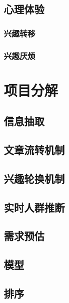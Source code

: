 \documentclass[11pt]{article}
\begin{document}
\subsection{心理体验}
\subsubsection{兴趣转移}
\subsubsection{兴趣厌烦}

%
\section{项目分解}
\subsection{信息抽取}
\subsection{文章流转机制}
\subsection{兴趣轮换机制}
\subsection{实时人群推断}
\subsection{需求预估}
\subsection{模型}
\subsection{排序}

\begin{comment}
$$\sum_{p\rm\;prime}f(p) = \int_{t>1}f(t)d\pi(t).$$

$$2\uparrow\uparrow k
\mathrel{\mathop=^{\rm definition}}
2^{2^{\cdot^{\cdot^{\cdot^2}}}}
\vbox{\hbox{$\Big\}\scriptstyle k$}\kern0pt}.$$
\end{comment}
\end{document}
